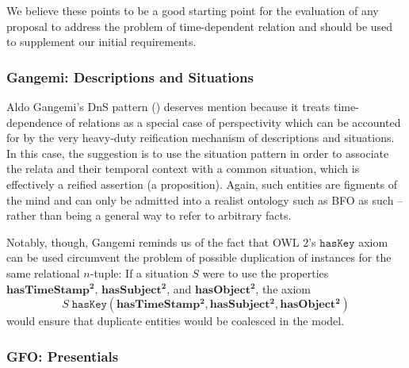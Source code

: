 \documentclass{ao2e}
\newcommand{\mirel}[1]{\ensuremath{\mathrm{\mathbf{#1}}}}
\newcommand{\mclass}[1]{\ensuremath{\mathit{#1}}}
\newcommand{\mrel}[2]{\mirel{#1^#2}}
\newcommand{\mrelb}[1]{\mrel{#1}{2}}
\begin{document}
We believe these points to be a good starting point for the evaluation of
any proposal to address the problem of time-dependent relation and should be
used to supplement our initial requirements.

\subsubsection{Gangemi: Descriptions and Situations}
Aldo Gangemi's DnS pattern (\cite{Gangemi:DnS}) deserves mention because it treats
time-dependence of relations as a special case of perspectivity which can be
accounted for by the very heavy-duty reification mechanism of descriptions and
situations. In this case, the suggestion is to use the situation pattern in
order to associate the relata and their temporal context with a common
situation, which is effectively a reified assertion (a proposition). Again, such
entities are figments of the mind and can only be admitted into a realist
ontology such as BFO as such -- rather than being a general way to refer to
arbitrary facts. 

Notably, though, Gangemi reminds us of the fact that OWL 2's $\mathtt{hasKey}$
axiom can be used circumvent the problem of possible duplication of instances
for the same relational $n$-tuple: If a situation $\mclass{S}$ were to use the properties
$\mrelb{hasTimeStamp}$, $\mrelb{hasSubject}$, and $\mrelb{hasObject}$, the axiom
\begin{equation}
\mclass{S}\;\mathtt{hasKey}(\mrelb{hasTimeStamp}, \mrelb{hasSubject},
\mrelb{hasObject})
\end{equation}
would ensure that duplicate entities would be coalesced in the model.

\subsubsection{GFO: Presentials}
\end{document}
